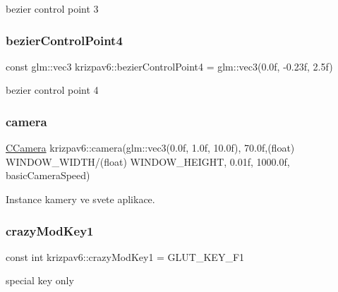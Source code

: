 bezier control point 3 

\mbox{\label{namespacekrizpav6_add565cdbdac84919dfd3ecc10ed27502}} 
\subsubsection{\texorpdfstring{bezierControlPoint4}{bezierControlPoint4}}
{\footnotesize\ttfamily const glm\+::vec3 krizpav6\+::bezier\+Control\+Point4 = glm\+::vec3(0.\+0f, -\/0.\+23f, 2.\+5f)}



bezier control point 4 

\mbox{\label{namespacekrizpav6_a29ec3a9ac3955a973f09e9c4afcf3efa}} 
\subsubsection{\texorpdfstring{camera}{camera}}
{\footnotesize\ttfamily \mbox{\hyperlink{class_c_camera}{C\+Camera}} krizpav6\+::camera(glm\+::vec3(0.\+0f, 1.\+0f, 10.\+0f), 70.\+0f,(float) W\+I\+N\+D\+O\+W\+\_\+\+W\+I\+D\+T\+H/(float) W\+I\+N\+D\+O\+W\+\_\+\+H\+E\+I\+G\+H\+T, 0.\+01f, 1000.\+0f, basic\+Camera\+Speed)}



Instance kamery ve svete aplikace. 

\mbox{\label{namespacekrizpav6_af7426813619adcf1bf06ea1aad6047cf}} 
\subsubsection{\texorpdfstring{crazyModKey1}{crazyModKey1}}
{\footnotesize\ttfamily const int krizpav6\+::crazy\+Mod\+Key1 = G\+L\+U\+T\+\_\+\+K\+E\+Y\+\_\+\+F1}



special key only 

\mbox{\label{namespacekrizpav6_ad48c2439fa0c82463864ed1bcff4f40e}} 
